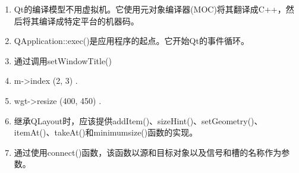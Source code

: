\begin{enumerate}
	\item Qt的编译模型不用虚拟机。它使用元对象编译器(MOC)将其翻译成C++，然后将其编译成特定平台的机器码。
	\item QApplication::exec()是应用程序的起点。它开始Qt的事件循环。
	\item 通过调用setWindowTitle() 
	\item m->index (2, 3) . 
	\item wgt->resize (400, 450) . 
	\item 继承QLayout时，应该提供addItem()、sizeHint()、setGeometry()、itemAt()、takeAt()和minimumsize()函数的实现。
	\item 通过使用connect()函数，该函数以源和目标对象以及信号和槽的名称作为参数。
\end{enumerate}













